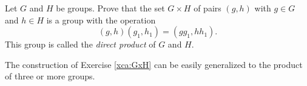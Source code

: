 \begin{exercise}
  \label{xca:GxH}
  Let $G$ and $H$ be groups. Prove that 
  the set 
  $G\times H$
  of pairs $(g,h)$ with $g\in G$ and 
  $h\in H$ is a group with
  the operation
  \[
    (g,h)(g_1,h_1)=(gg_1,hh_1).
  \]
  This group is called the 
  \emph{direct product} of $G$ and $H$.
\end{exercise}

The construction of Exercise \ref{xca:GxH}
can be easily generalized to the product of 
three or more groups.

